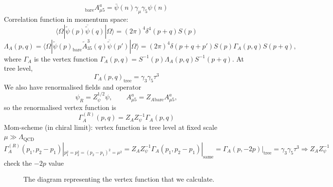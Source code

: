 \begin{equation}
{}_\text{bare}A^a_{\mu 5} = \bar{\psi}(n)\gamma_\mu\gamma_5 \psi(n)
\end{equation}
Correlation function in momentum space:
\begin{equation}
    \langle \Omega | \tilde{\psi}(p) \overline{\tilde{\psi}}(q)|\Omega\rangle = (2 \pi)^4 \delta^4(p+q)S(p)
\end{equation}
\begin{equation}
    \Lambda_A(p,q) = \langle \Omega | \tilde{\psi}(p)_\text{bare}\tilde{A}_{35}^3(q)\overline{\tilde{\psi}}(p')|\Omega \rangle = (2 \pi)^4 \delta(p+q+p')S(p)\Gamma_A(p,q)S(p+q),
\end{equation}
where $\Gamma_A$ is the vertex function $\Gamma_A(p,q) = S^{-1}(p)\Lambda_A(p,q)S^{-1}(p+q)$. At tree level,
\begin{equation}
    \Gamma_A(p,q)_\text{tree} = \gamma_3 \gamma_5 \tau^3
\end{equation}
We also have renormalised fields and operator
\begin{equation}
    \psi_R = Z_\psi^{1/2}\psi, \qquad A_{\mu 5}^a = Z_A {}_\text{bare}A_{\mu 5}^a,
\end{equation}
so the renormalised vertex function is 
\begin{equation}
    \Gamma_A^{(R)}(p,q) = Z_A Z_\psi^{-1}\Gamma_A(p,q)
\end{equation}
Mom-scheme (in chiral limit): vertex function is tree level at fixed scale $\mu \gg \Lambda_{\text{QCD}}$
\begin{equation}
    \Gamma_A^{(R)}(p_1, p_2 - p_1)|_{p_1^2 = p_2^2 = (p_2 - p_1)^2 = \mu^2} = Z_A Z_\psi^{-1} \Gamma_A(p_1, p_2 - p_1)|_{\text{same}} = \Gamma_A(p,-2p)|_\text{tree} = \gamma_3 \gamma_5 \tau^3 \Rightarrow Z_A Z_\psi^{-1}
\end{equation}
{\color{red} check the $-2p$ value}
\begin{figure}
\label{fig:vert_func}
\caption{The diagram representing the vertex function that we calculate.}
\end{figure}

